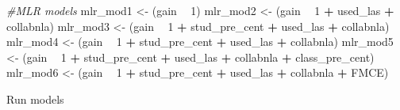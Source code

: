 \documentclass[]{article}
\newenvironment{Shaded}{\begin{snugshade}}{\end{snugshade}}
\newcommand{\DecValTok}[1]{\textcolor[rgb]{0.00,0.00,0.81}{#1}}
\newcommand{\StringTok}[1]{\textcolor[rgb]{0.31,0.60,0.02}{#1}}
\newcommand{\CommentTok}[1]{\textcolor[rgb]{0.56,0.35,0.01}{\textit{#1}}}
\newcommand{\OperatorTok}[1]{\textcolor[rgb]{0.81,0.36,0.00}{\textbf{#1}}}
\newcommand{\NormalTok}[1]{#1}
\begin{document}
\begin{Shaded}
\begin{Highlighting}[]
\CommentTok{#MLR models}
\NormalTok{mlr_mod1 <-}\StringTok{ }\NormalTok{(gain }\OperatorTok{~}\StringTok{ }\DecValTok{1}\NormalTok{)}
\NormalTok{mlr_mod2 <-}\StringTok{ }\NormalTok{(gain }\OperatorTok{~}\StringTok{ }\DecValTok{1} \OperatorTok{+}\StringTok{ }\NormalTok{used_las }\OperatorTok{+}\StringTok{ }\NormalTok{collabnla)}
\NormalTok{mlr_mod3 <-}\StringTok{ }\NormalTok{(gain }\OperatorTok{~}\StringTok{ }\DecValTok{1} \OperatorTok{+}\StringTok{ }\NormalTok{stud_pre_cent }\OperatorTok{+}\StringTok{  }\NormalTok{used_las }\OperatorTok{+}\StringTok{ }\NormalTok{collabnla)}
\NormalTok{mlr_mod4 <-}\StringTok{ }\NormalTok{(gain }\OperatorTok{~}\StringTok{ }\DecValTok{1} \OperatorTok{+}\StringTok{ }\NormalTok{stud_pre_cent }\OperatorTok{+}\StringTok{  }\NormalTok{used_las }\OperatorTok{+}\StringTok{ }\NormalTok{collabnla)}
\NormalTok{mlr_mod5 <-}\StringTok{ }\NormalTok{(gain }\OperatorTok{~}\StringTok{ }\DecValTok{1} \OperatorTok{+}\StringTok{ }\NormalTok{stud_pre_cent }\OperatorTok{+}\StringTok{  }\NormalTok{used_las }\OperatorTok{+}\StringTok{ }\NormalTok{collabnla }\OperatorTok{+}\StringTok{ }\NormalTok{class_pre_cent)}
\NormalTok{mlr_mod6 <-}\StringTok{ }\NormalTok{(gain }\OperatorTok{~}\StringTok{ }\DecValTok{1} \OperatorTok{+}\StringTok{ }\NormalTok{stud_pre_cent }\OperatorTok{+}\StringTok{  }\NormalTok{used_las }\OperatorTok{+}\StringTok{ }\NormalTok{collabnla }\OperatorTok{+}\StringTok{ }\NormalTok{FMCE)}
\end{Highlighting}
\end{Shaded}

Run models
\end{document}
